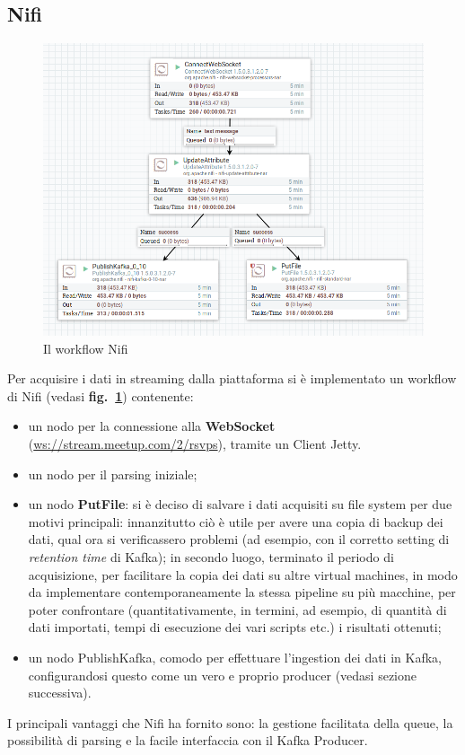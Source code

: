 \documentclass[fleqn,10pt]{SelfArx} %
\begin{document}
{\subsection{Nifi}%
\begin{figure}
\includegraphics[scale=0.3]{images/nifi_workflow.png}
\caption{\label{nifi_workflow} Il workflow Nifi}
\end{figure}
Per acquisire i dati in streaming dalla piattaforma si è implementato un workflow di Nifi (vedasi \textbf{fig.~\ref{nifi_workflow}}) contenente: 
\begin{itemize} %
\item un nodo per la connessione alla \textbf{WebSocket} (\url{ws://stream.meetup.com/2/rsvps}), tramite un Client Jetty. 
\item un nodo per il parsing iniziale;
\item un nodo \textbf{PutFile}: si è deciso di salvare i dati acquisiti su file system per due motivi principali: innanzitutto ciò è utile per avere una copia di backup dei dati, qual ora si verificassero problemi (ad esempio, con il corretto setting di \textit{retention time} di Kafka); in secondo luogo, terminato il periodo di acquisizione, per facilitare la copia dei dati su altre virtual machines, in modo da implementare contemporaneamente la stessa pipeline su più macchine, per poter confrontare (quantitativamente, in termini, ad esempio, di quantità di dati importati, tempi di esecuzione dei vari scripts etc.) i risultati ottenuti;
\item un nodo PublishKafka, comodo per effettuare l'ingestion dei dati in Kafka, configurandosi questo come un vero e proprio producer (vedasi sezione successiva). %
\end{itemize} 
I principali vantaggi che Nifi ha fornito sono: la gestione facilitata della queue, la possibilità di parsing e la facile interfaccia con il Kafka Producer.
}
\end{document}

